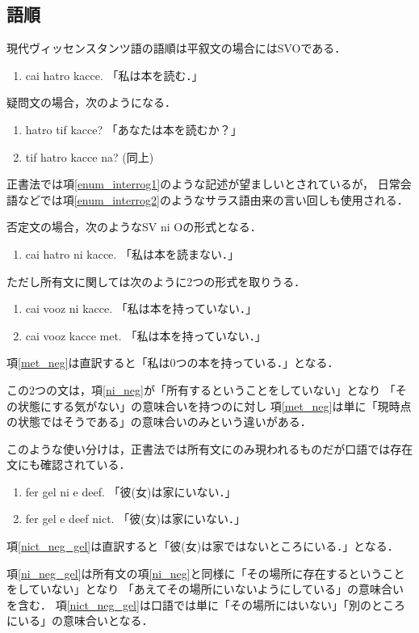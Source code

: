 \documentclass[uplatex,a4paper]{jsarticle}
\begin{document}
\subsection{語順}
現代ヴィッセンスタンツ語の語順は平叙文の場合にはSVOである．
\begin{enumerate}
 \item cai hatro kacce. 「私は本を読む．」 
\end{enumerate}

疑問文の場合，次のようになる．
\begin{enumerate}
 \item hatro tif kacce? 「あなたは本を読むか？」 \label{enum_interrog1}
 \item tif hatro kacce na? (同上) \label{enum_interrog2}
\end{enumerate}
正書法では項\ref{enum_interrog1}のような記述が望ましいとされているが，
日常会語などでは項\ref{enum_interrog2}のようなサラス語由来の言い回しも使用される．

否定文の場合，次のようなSV ni Oの形式となる．
\begin{enumerate}
 \item cai hatro ni kacce. 「私は本を読まない．」
\end{enumerate}
ただし所有文に関しては次のように2つの形式を取りうる．
\begin{enumerate}
 \item cai vooz ni kacce. 「私は本を持っていない．」 \label{ni_neg}
 \item cai vooz kacce met. 「私は本を持っていない．」\label{met_neg}
\end{enumerate}
項\ref{met_neg}は直訳すると「私は0つの本を持っている．」となる．

この2つの文は，項\ref{ni_neg}が「所有するということをしていない」となり
「その状態にする気がない」の意味合いを持つのに対し
項\ref{met_neg}は単に「現時点の状態ではそうである」の意味合いのみという違いがある．

このような使い分けは，正書法では所有文にのみ現われるものだが口語では存在文にも確認されている．
\begin{enumerate}
 \item fer gel ni e deef. 「彼(女)は家にいない．」\label{ni_neg_gel}
 \item fer gel e deef nict. 「彼(女)は家にいない．」\label{nict_neg_gel}
\end{enumerate}
項\ref{nict_neg_gel}は直訳すると「彼(女)は家ではないところにいる．」となる．

項\ref{ni_neg_gel}は所有文の項\ref{ni_neg}と同様に「その場所に存在するということをしていない」となり
「あえてその場所にいないようにしている」の意味合いを含む．
項\ref{nict_neg_gel}は口語では単に「その場所にはいない」「別のところにいる」の意味合いとなる．
\end{document}
